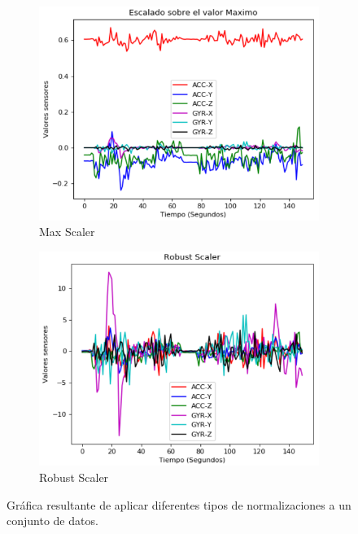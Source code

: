 \begin{figure}
        \begin{subfigure}[h]{0.45\textwidth} 
            \includegraphics[width=\textwidth]{imagenes/Cap3/max}
            \caption{Max Scaler}
            \label{fig:max}
        \end{subfigure}       
        \begin{subfigure}[h]{0.45\textwidth} 
            \includegraphics[width=\textwidth]{imagenes/Cap3/robust}
            \caption{Robust Scaler}
            \label{fig:robust}
        \end{subfigure}
        \caption{Gr\'{a}fica resultante de aplicar diferentes tipos de normalizaciones a un conjunto de datos.}
        
		\label{fig:nor_nor}
    \end{figure}

